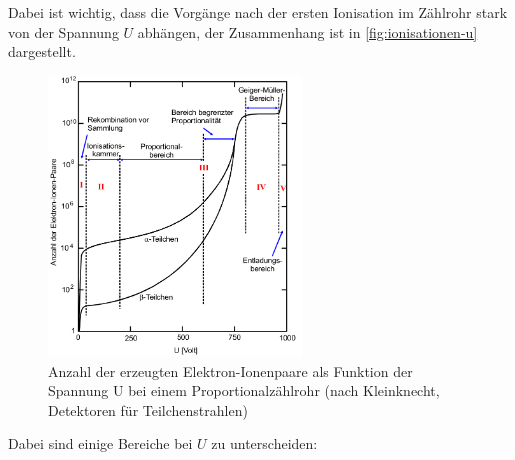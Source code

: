 \noindent
Dabei ist wichtig, dass die Vorgänge nach der ersten Ionisation im Zählrohr stark von der Spannung $U$ 
abhängen, der Zusammenhang ist in \autoref{fig:ionisationen-u} dargestellt.
\begin{figure}[H]
	\centering
	\includegraphics[width=0.6\textwidth]{content/ionisationen-u.png}
	\caption{Anzahl der erzeugten Elektron-Ionenpaare als Funktion der Spannung U bei einem
	Proportionalzählrohr (nach Kleinknecht, Detektoren für Teilchenstrahlen) \cite{sample}}
	\label{fig:ionisationen-u}
\end{figure}
Dabei sind einige Bereiche bei $U$ zu unterscheiden:
